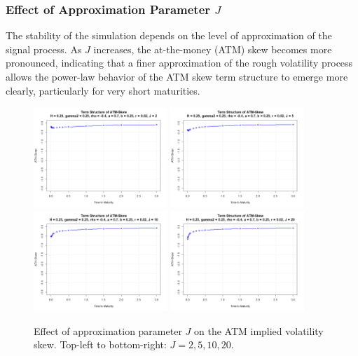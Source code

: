 \subsubsection*{Effect of Approximation Parameter $J$}
\begin{minipage}{\textwidth}
The stability of the simulation depends on the level of approximation of the signal process. As $J$ increases, the at-the-money (ATM) skew becomes more pronounced, indicating that a finer approximation of the rough volatility process allows the power-law behavior of the ATM skew term structure to emerge more clearly, particularly for very short maturities.
\begin{figure}[H]
    \centering
    \includegraphics[width=0.45\textwidth]{figures/5.2 Individual Parameter Effects/J=2_atm_skew.png}
    \includegraphics[width=0.45\textwidth]{figures/5.2 Individual Parameter Effects/J=5_atm_skew.png}
    \includegraphics[width=0.45\textwidth]{figures/5.2 Individual Parameter Effects/J=10_atm_skew.png}
    \includegraphics[width=0.45\textwidth]{figures/5.2 Individual Parameter Effects/J=20_atm_skew.png}
    \caption{Effect of approximation parameter $J$ on the ATM implied volatility skew. Top-left to bottom-right: $J=2,5,10,20$.}
    \label{fig:J_effect}
\end{figure}
\end{minipage}

